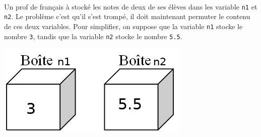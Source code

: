 \documentclass[a4paper,12pt]{article}
\begin{document}
\exo{}  ~\\ 
 Un prof de français à stocké les notes de deux de ses élèves dans les variable \lstinline{n1} et \lstinline{n2}. Le problème c'est qu'il s'est trompé, il doit maintenant permuter le contenu de ces deux variables.   Pour simplifier, on suppose que la variable  \lstinline{n1} stocke le nombre  \lstinline{3}, tandis que la variable  \lstinline{n2} stocke le nombre  \lstinline{5.5}.
\begin{center}
	\vspace{-5mm}
	\includegraphics[width=0.3\linewidth]{images/exo_permut.png}
\end{center}
\vspace{-5mm}
\end{document}
